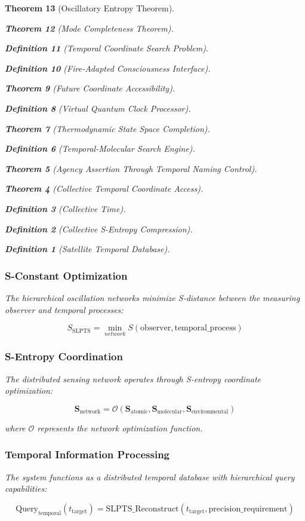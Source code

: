 \documentclass[12pt,a4paper]{article}
\newtheorem{theorem}{Theorem}[section]
\newtheorem{definition}[theorem]{Definition}
\begin{document}
\begin{theorem}[Oscillatory Entropy Theorem]
\begin{theorem}[Mode Completeness Theorem]
\begin{enumerate}
\begin{definition}[Temporal Coordinate Search Problem]
\begin{algorithm}
\begin{definition}[Fire-Adapted Consciousness Interface]
\begin{theorem}[Future Coordinate Accessibility]
\begin{definition}[Virtual Quantum Clock Processor]
\begin{itemize}
\begin{itemize}
\begin{theorem}[Thermodynamic State Space Completion]
\begin{definition}[Temporal-Molecular Search Engine]
\begin{theorem}[Agency Assertion Through Temporal Naming Control]
\begin{remark}
\begin{theorem}[Collective Temporal Coordinate Access]
\begin{definition}[Collective Time]
\begin{definition}[Collective S-Entropy Compression]
\begin{definition}[Satellite Temporal Database]
\begin{algorithm}
\begin{table}[h]
{{\subsubsection{S-Constant Optimization}

The hierarchical oscillation networks minimize S-distance between the measuring observer and temporal processes:

\begin{equation}
S_{\text{SLPTS}} = \min_{network} S(\text{observer}, \text{temporal\_process})
\end{equation}

\subsubsection{S-Entropy Coordination}

The distributed sensing network operates through S-entropy coordinate optimization:

\begin{equation}
\mathbf{S}_{\text{network}} = \mathcal{O}(\mathbf{S}_{\text{atomic}}, \mathbf{S}_{\text{molecular}}, \mathbf{S}_{\text{environmental}})
\end{equation}

where $\mathcal{O}$ represents the network optimization function.

\subsubsection{Temporal Information Processing}

The system functions as a distributed temporal database with hierarchical query capabilities:

\begin{equation}
\text{Query}_{\text{temporal}}(t_{\text{target}}) = \text{SLPTS\_Reconstruct}(t_{\text{target}}, \text{precision\_requirement})
\end{equation}

}}
\end{table}
\end{algorithm}
\end{definition}
\end{definition}
\end{definition}
\end{theorem}
\end{remark}
\end{theorem}
\end{definition}
\end{theorem}
\end{itemize}
\end{itemize}
\end{definition}
\end{theorem}
\end{definition}
\end{algorithm}
\end{definition}
\end{enumerate}
\end{theorem}
\end{theorem}
\end{document}
